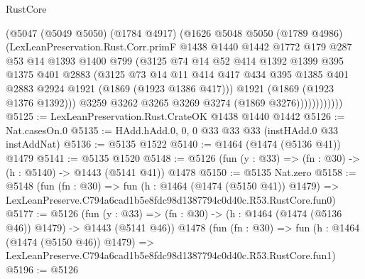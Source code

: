 \begin{lexlean}{RustCore}
\begin{coremodule}
                    (@5047
                      (@5049 @5050)
                      (@1784 @4917)
                      (@1626
                        @5048
                        @5050
                        (@1789 @4986)
                        (LexLeanPreservation.Rust.Corr.primF
                          @1438
                          @1440
                          @1442
                          @1772
                          @179
                          @287
                          @53
                          @14
                          @1393
                          @1400
                          @799
                          (@3125
                            @74
                            @14
                            @52
                            @414
                            @1392
                            @1399
                            @395
                            @1375
                            @401
                            @2883
                            (@3125
                              @73
                              @14
                              @11
                              @414
                              @417
                              @434
                              @395
                              @1385
                              @401
                              @2883
                              @2924
                              @1921
                              (@1869 (@1923 @1386 @417)))
                            @1921
                            (@1869 (@1923 @1376 @1392)))
                          @3259
                          @3262
                          @3265
                          @3269
                          @3274
                          (@1869 @3276))))))))))))
@5125 := LexLeanPreservation.Rust.CrateOK @1438 @1440 @1442
@5126 := Nat.casesOn.{0}
@5135 := HAdd.hAdd.{0, 0, 0} @33 @33 @33 (instHAdd.{0} @33 instAddNat)
@5136 := @5135 @1522
@5140 := @1464 (@1474 (@5136 @41)) @1479
@5141 := @5135 @1520
@5148 := @5126 (fun (y : @33) => (fn : @30) -> (h : @5140) -> @1443 (@5141 @41)) @1478
@5150 := @5135 Nat.zero
@5158 := @5148
    (fun (fn : @30) =>
    fun (h : @1464 (@1474 (@5150 @41)) @1479) =>
    LexLeanPreserve.C794a6cad1b5e8fdc98d1387794c0d40c.R53.RustCore.fun0)
@5177 := @5126
    (fun (y : @33) => (fn : @30) -> (h : @1464 (@1474 (@5136 @46)) @1479) -> @1443 (@5141 @46))
    @1478
    (fun (fn : @30) =>
    fun (h : @1464 (@1474 (@5150 @46)) @1479) =>
    LexLeanPreserve.C794a6cad1b5e8fdc98d1387794c0d40c.R53.RustCore.fun1)
@5196 := @5126

\end{coremodule}
\end{lexlean}
